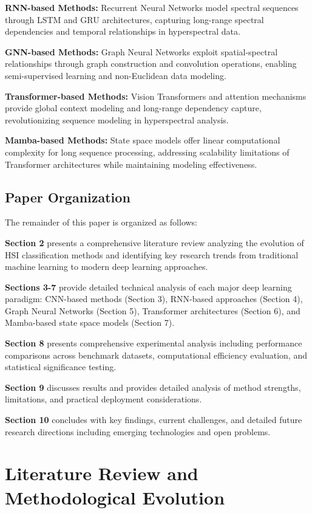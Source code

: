 \documentclass[journal]{IEEEtran}
\begin{document}
\textbf{RNN-based Methods:} Recurrent Neural Networks model spectral sequences through LSTM and GRU architectures, capturing long-range spectral dependencies and temporal relationships in hyperspectral data.

\textbf{GNN-based Methods:} Graph Neural Networks exploit spatial-spectral relationships through graph construction and convolution operations, enabling semi-supervised learning and non-Euclidean data modeling.

\textbf{Transformer-based Methods:} Vision Transformers and attention mechanisms provide global context modeling and long-range dependency capture, revolutionizing sequence modeling in hyperspectral analysis.

\textbf{Mamba-based Methods:} State space models offer linear computational complexity for long sequence processing, addressing scalability limitations of Transformer architectures while maintaining modeling effectiveness.

\subsection{Paper Organization}

The remainder of this paper is organized as follows:

\textbf{Section 2} presents a comprehensive literature review analyzing the evolution of HSI classification methods and identifying key research trends from traditional machine learning to modern deep learning approaches.

\textbf{Sections 3-7} provide detailed technical analysis of each major deep learning paradigm: CNN-based methods (Section 3), RNN-based approaches (Section 4), Graph Neural Networks (Section 5), Transformer architectures (Section 6), and Mamba-based state space models (Section 7).

\textbf{Section 8} presents comprehensive experimental analysis including performance comparisons across benchmark datasets, computational efficiency evaluation, and statistical significance testing.

\textbf{Section 9} discusses results and provides detailed analysis of method strengths, limitations, and practical deployment considerations.

\textbf{Section 10} concludes with key findings, current challenges, and detailed future research directions including emerging technologies and open problems.

\section{Literature Review and Methodological Evolution}
\end{document}
